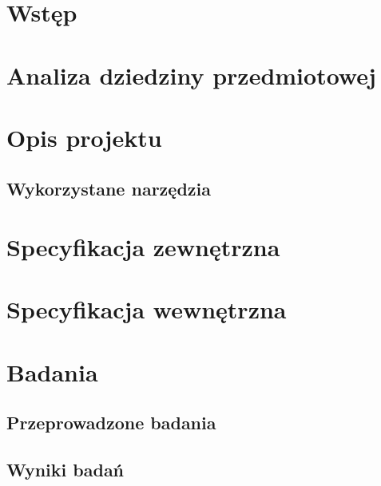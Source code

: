 \documentclass[12pt,a4paper,twoside,openright,titlepage]{report}
\begin{document}
    \begin{large}
        \tableofcontents
        \let\cleardoublepage\clearpage
        \chapter{Wstęp}
            
        \chapter{Analiza dziedziny przedmiotowej}
            
        \chapter{Opis projektu}
            \section{Wykorzystane narzędzia}
        \chapter{Specyfikacja zewnętrzna}
            \blindtext
        \chapter{Specyfikacja wewnętrzna}
            \blindtext
        \chapter{Badania}
            \blindtext
            \section{Przeprowadzone badania}
            \section{Wyniki badań}

\end{large}
\end{document}
